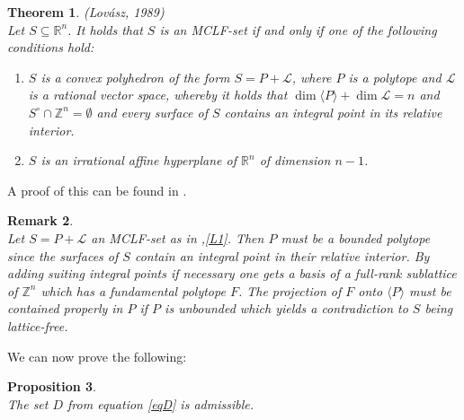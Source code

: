 \documentclass[10pt, preprint]{elsarticle}
\newtheorem{theorem}{Theorem}[section]
\newtheorem{proposition}[theorem]{Proposition}
\newtheorem{remark}[theorem]{Remark}
\theoremstyle{definition}
\theoremstyle{definition}
\newcommand{\Z}{\mathbb{Z}}
\newcommand{\R}{\mathbb{R}}
\newcommand{\calL}{\mathcal{L}}
\begin{document}
\begin{theorem}\label{theoLovasz}(Lov\'asz, 1989)\\
Let $S\subseteq\R^n$. It holds that $S$ is an MCLF-set if and only if one of the following conditions hold:
\begin{enumerate}
\item\label{L1} $S$ is a convex polyhedron of the form $S=P+\calL$, where $P$ is a polytope and $\calL$ is a rational vector space, whereby it holds that $\dim\langle P\rangle+\dim\calL=n$ and $S^\circ\cap\Z^n=\emptyset$ and every surface of $S$ contains an integral point in its relative interior.
\item $S$ is an irrational affine hyperplane of $\R^n$ of dimension $n-1$.
\end{enumerate}
\end{theorem}
A proof of this can be found in \cite{Lov}.
\begin{remark}\mbox{}\\
Let $S=P+\calL$ an MCLF-set as in ,\ref{L1}. Then $P$ must be a bounded polytope since the surfaces of $S$ contain an integral point in their relative interior. By adding suiting integral points if necessary one gets a basis of a full-rank sublattice of $\Z^n$ which has a fundamental polytope $F$. The projection of $F$ onto $\langle P\rangle$ must be contained properly in $P$ if $P$ is unbounded which yields a contradiction to $S$ being lattice-free.  
\end{remark}
We can now prove the following:
\begin{proposition}\label{propDadm}\mbox{}\\
The set $D$ from equation \eqref{eqD} is admissible.
\end{proposition}
\end{document}
